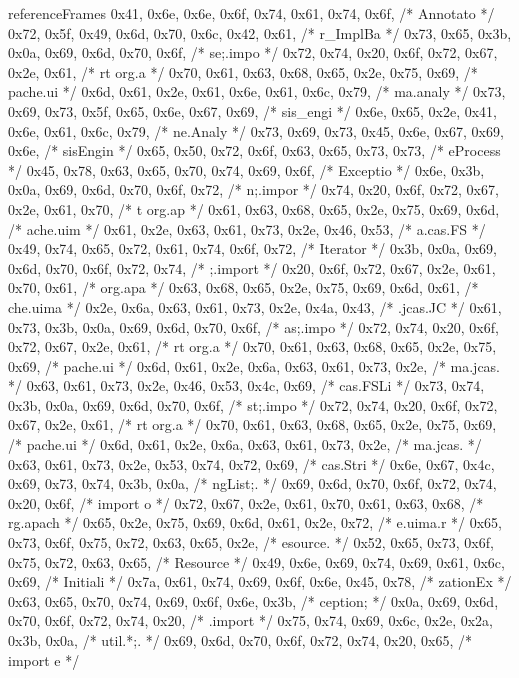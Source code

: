 \begin{chunk}{referenceFrames}
{0x41, 0x6e, 0x6e, 0x6f, 0x74, 0x61, 0x74, 0x6f, /* Annotato */
0x72, 0x5f, 0x49, 0x6d, 0x70, 0x6c, 0x42, 0x61, /* r_ImplBa */
0x73, 0x65, 0x3b, 0x0a, 0x69, 0x6d, 0x70, 0x6f, /* se;.impo */
0x72, 0x74, 0x20, 0x6f, 0x72, 0x67, 0x2e, 0x61, /* rt org.a */
0x70, 0x61, 0x63, 0x68, 0x65, 0x2e, 0x75, 0x69, /* pache.ui */
0x6d, 0x61, 0x2e, 0x61, 0x6e, 0x61, 0x6c, 0x79, /* ma.analy */
0x73, 0x69, 0x73, 0x5f, 0x65, 0x6e, 0x67, 0x69, /* sis_engi */
0x6e, 0x65, 0x2e, 0x41, 0x6e, 0x61, 0x6c, 0x79, /* ne.Analy */
0x73, 0x69, 0x73, 0x45, 0x6e, 0x67, 0x69, 0x6e, /* sisEngin */
0x65, 0x50, 0x72, 0x6f, 0x63, 0x65, 0x73, 0x73, /* eProcess */
0x45, 0x78, 0x63, 0x65, 0x70, 0x74, 0x69, 0x6f, /* Exceptio */
0x6e, 0x3b, 0x0a, 0x69, 0x6d, 0x70, 0x6f, 0x72, /* n;.impor */
0x74, 0x20, 0x6f, 0x72, 0x67, 0x2e, 0x61, 0x70, /* t org.ap */
0x61, 0x63, 0x68, 0x65, 0x2e, 0x75, 0x69, 0x6d, /* ache.uim */
0x61, 0x2e, 0x63, 0x61, 0x73, 0x2e, 0x46, 0x53, /* a.cas.FS */
0x49, 0x74, 0x65, 0x72, 0x61, 0x74, 0x6f, 0x72, /* Iterator */
0x3b, 0x0a, 0x69, 0x6d, 0x70, 0x6f, 0x72, 0x74, /* ;.import */
0x20, 0x6f, 0x72, 0x67, 0x2e, 0x61, 0x70, 0x61, /*  org.apa */
0x63, 0x68, 0x65, 0x2e, 0x75, 0x69, 0x6d, 0x61, /* che.uima */
0x2e, 0x6a, 0x63, 0x61, 0x73, 0x2e, 0x4a, 0x43, /* .jcas.JC */
0x61, 0x73, 0x3b, 0x0a, 0x69, 0x6d, 0x70, 0x6f, /* as;.impo */
0x72, 0x74, 0x20, 0x6f, 0x72, 0x67, 0x2e, 0x61, /* rt org.a */
0x70, 0x61, 0x63, 0x68, 0x65, 0x2e, 0x75, 0x69, /* pache.ui */
0x6d, 0x61, 0x2e, 0x6a, 0x63, 0x61, 0x73, 0x2e, /* ma.jcas. */
0x63, 0x61, 0x73, 0x2e, 0x46, 0x53, 0x4c, 0x69, /* cas.FSLi */
0x73, 0x74, 0x3b, 0x0a, 0x69, 0x6d, 0x70, 0x6f, /* st;.impo */
0x72, 0x74, 0x20, 0x6f, 0x72, 0x67, 0x2e, 0x61, /* rt org.a */
0x70, 0x61, 0x63, 0x68, 0x65, 0x2e, 0x75, 0x69, /* pache.ui */
0x6d, 0x61, 0x2e, 0x6a, 0x63, 0x61, 0x73, 0x2e, /* ma.jcas. */
0x63, 0x61, 0x73, 0x2e, 0x53, 0x74, 0x72, 0x69, /* cas.Stri */
0x6e, 0x67, 0x4c, 0x69, 0x73, 0x74, 0x3b, 0x0a, /* ngList;. */
0x69, 0x6d, 0x70, 0x6f, 0x72, 0x74, 0x20, 0x6f, /* import o */
0x72, 0x67, 0x2e, 0x61, 0x70, 0x61, 0x63, 0x68, /* rg.apach */
0x65, 0x2e, 0x75, 0x69, 0x6d, 0x61, 0x2e, 0x72, /* e.uima.r */
0x65, 0x73, 0x6f, 0x75, 0x72, 0x63, 0x65, 0x2e, /* esource. */
0x52, 0x65, 0x73, 0x6f, 0x75, 0x72, 0x63, 0x65, /* Resource */
0x49, 0x6e, 0x69, 0x74, 0x69, 0x61, 0x6c, 0x69, /* Initiali */
0x7a, 0x61, 0x74, 0x69, 0x6f, 0x6e, 0x45, 0x78, /* zationEx */
0x63, 0x65, 0x70, 0x74, 0x69, 0x6f, 0x6e, 0x3b, /* ception; */
0x0a, 0x69, 0x6d, 0x70, 0x6f, 0x72, 0x74, 0x20, /* .import  */
0x75, 0x74, 0x69, 0x6c, 0x2e, 0x2a, 0x3b, 0x0a, /* util.*;. */
0x69, 0x6d, 0x70, 0x6f, 0x72, 0x74, 0x20, 0x65, /* import e */
}
\end{chunk}
